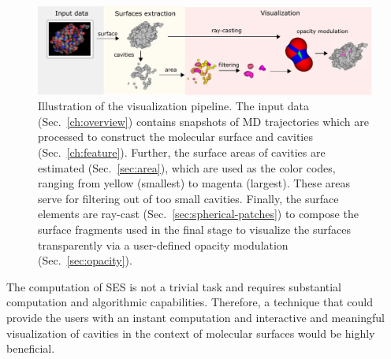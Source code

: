 \begin{figure}[tb]
  \centering
  \includegraphics[width=\textwidth]{image/overview_final.pdf}
  \caption{Illustration of the visualization pipeline. The input data (Sec.~\ref{ch:overview}) contains snapshots of MD trajectories which are processed to construct the molecular surface and cavities (Sec.~\ref{ch:feature}). Further, the surface areas of cavities are estimated (Sec.~\ref{sec:area}), which are used as the color codes, ranging from yellow (smallest) to magenta (largest). These areas serve for filtering out of too small cavities. Finally, the surface elements are ray-cast (Sec.~\ref{sec:spherical-patches}) to compose the surface fragments used in the final stage to visualize the surfaces transparently via a user-defined opacity modulation (Sec.~\ref{sec:opacity}).}
	\label{fig:overview}
\end{figure}

The computation of SES is not a trivial task and requires substantial computation and algorithmic capabilities. 
Therefore, a technique that could provide the users with an instant computation and interactive and meaningful visualization of cavities in the context of molecular surfaces would be highly beneficial.

